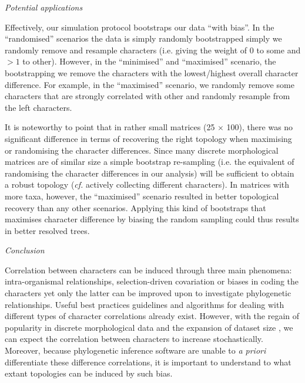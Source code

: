 \documentclass[12pt,letterpaper]{article}
\renewcommand{\subsection}[1]{%
\bigskip
\begin{center}
\begin{large}
\normalfont\itshape #1
\end{large}
\end{center}}
\begin{document}
\subsection{Potential applications}
Effectively, our simulation protocol bootstraps our data ``with bias''.
In the ``randomised'' scenarios the data is simply randomly bootstrapped simply we randomly remove and resample characters (i.e. giving the weight of $0$ to some and $>1$ to other).
However, in the ``minimised'' and ``maximised'' scenario, the bootstrapping we remove the characters with the lowest/highest overall character difference.
For example, in the ``maximised'' scenario, we randomly remove some characters that are strongly correlated with other and randomly resample from the left characters.

It is noteworthy to point that in rather small matrices (25 $\times$ 100), there was no significant difference in terms of recovering the right topology when maximising or randomising the character differences.
Since many discrete morphological matrices are of similar size \citep{guillerme2016assessment} a simple bootstrap re-sampling (i.e. the equivalent of randomising the character differences in our analysis) will be sufficient to obtain a robust topology (\textit{cf.} actively collecting different characters).
In matrices with more taxa, however, the ``maximised'' scenario resulted in better topological recovery than any other scenarios.
Applying this kind of bootstraps that maximises character difference by biasing the random sampling could thus results in better resolved trees.

\subsection{Conclusion}
Correlation between characters can be induced through three main phenomena: intra-organismal relationships, selection-driven covariation or biases in coding the characters yet only the latter can be improved upon to investigate phylogenetic relationships.
Useful best practices guidelines \citep[e.g.][]{Brazeau2011,simoes2017giant} and algorithms for dealing with different types of character correlations \citep[e.g. for characters hierarchy][]{deLaet2015,BrazeauNA} already exist.
However, with the regain of popularity in discrete morphological data and the expansion of dataset size \citep[e.g.][with more than 1000 characters each]{nithe2013,O'Leary08022013}, we can expect the correlation between characters to increase stochastically.
Moreover, because phylogenetic inference software are unable to \textit{a priori} differentiate these difference correlations, it is important to understand to what extant topologies can be induced by such bias.
\end{document}
